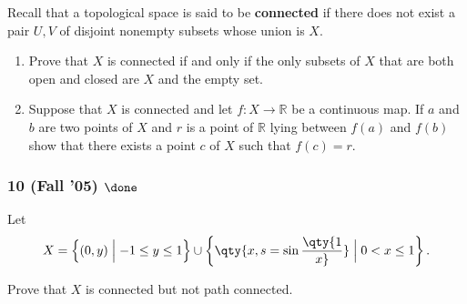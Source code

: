 \begin{problem}[?]

Recall that a topological space is said to be \textbf{connected} if
there does not exist a pair \(U, V\) of disjoint nonempty subsets whose
union is \(X\).

\begin{enumerate}
\def\labelenumi{\alph{enumi}.}
\item
  Prove that \(X\) is connected if and only if the only subsets of \(X\)
  that are both open and closed are \(X\) and the empty set.
\item
  Suppose that \(X\) is connected and let \(f : X \to {\mathbb{R}}\) be
  a continuous map. If \(a\) and \(b\) are two points of \(X\) and \(r\)
  is a point of \({\mathbb{R}}\) lying between \(f (a)\) and \(f (b)\)
  show that there exists a point \(c\) of \(X\) such that \(f (c) = r\).
\end{enumerate}

\end{problem}

\hypertarget{fall-05-done-1}{%
\subsubsection{\texorpdfstring{10 (Fall '05)
\(\done\)}{10 (Fall '05) \textbackslash done}}\label{fall-05-done-1}}

\begin{problem}[?]

Let
\begin{align*}
X = \left\{{(0, y) \mathrel{\Big|}- 1 \leq y \leq 1}\right\} \cup \left\{{\qty{x, s = \sin\qty{1 \over x}} \mathrel{\Big|}0 < x \leq 1}\right\}
.\end{align*}

Prove that \(X\) is connected but not path connected.

\end{problem}

